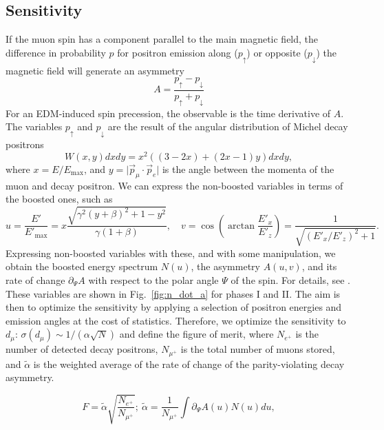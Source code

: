 \begin{refsection}
\section{Sensitivity}
\label{sec:muEDM:sensitivity}
    If the muon spin has a component parallel to the main magnetic field, the difference in probability $p$ for positron emission along ($p_\uparrow$) or opposite ($p_\downarrow$) the magnetic field will generate an asymmetry
    \begin{equation}
        A = \frac{p_\uparrow - p_\downarrow}{p_\uparrow + p_\downarrow}
    \label{eq:asym_theory}
    \end{equation}        
    For an EDM-induced spin precession, the observable is the time derivative of $A$.
    The variables $p_\uparrow$ and $p_\downarrow$ are the result of the angular distribution of Michel decay positrons
    \begin{equation}
        W(x, y)dxdy = x^2 \left((3-2x) + (2x - 1)y\right)dxdy,
    \end{equation}
    where $x = E/E_\mathrm{max}$, and $y = \lvert \vec p_\mu \cdot \vec p_e \rvert$ is the angle between the momenta of the muon and decay positron. 
    We can express the non-boosted variables in terms of the boosted ones, such as
    \begin{equation}
	u = \frac{E'}{E'_\mathrm{max}} = x\frac{\sqrt{\gamma^2 (y+\beta)^2 + 1 - y^2}}{\gamma(1+\beta)},\quad
	v = \cos\left(\arctan\frac{E'_x}{E'_z}\right) = \frac{1}{\sqrt{(E'_x/E'_z)^2 + 1}}.
    \end{equation}
    Expressing non-boosted variables with these, and with some manipulation, we obtain the boosted energy spectrum $N(u)$, the asymmetry $A(u, v)$, and its rate of change $\partial_\Psi A$ with respect to the polar angle $\Psi$ of the spin.
    For details, see \cite{chavdar:2023}.
    These variables are shown in Fig.~\ref{fig:n_dot_a} for phases I and II.
    \noindent
    The aim is then to optimize the sensitivity by applying a selection of positron energies and emission angles at the cost of statistics. Therefore, we optimize the sensitivity to $d_\mu$: $\sigma(d_\mu) \sim 1/(\alpha\sqrt{N})$ and define the figure of merit, where $N_{e^+}$ is the number of detected decay positrons, $N_{\mu^+}$ is the total number of muons stored, and $\tilde\alpha$ is the weighted average of the rate of change of the parity-violating decay asymmetry. 

    \begin{equation}
	F = \tilde\alpha \sqrt{\frac{N_{e^+}}{N_{\mu^+}}}; \ 
    \tilde\alpha = \frac{1}{N_{\mu^+}} \int \partial_\Psi A(u) N(u)
	du,
	\label{eq:figure_of_merit}
    \end{equation}


\end{refsection}
